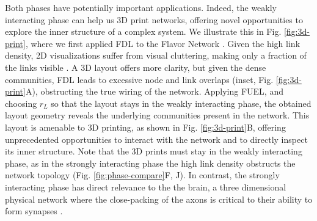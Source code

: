 \documentclass[linenumbers,endfloats,nofootinbib,preprint,floatfix,titlepage,superscriptaddress]{revtex4-1} %
\begin{document}
Both phases have potentially important applications. 
Indeed, the weakly interacting phase can help us 3D print networks, offering novel opportunities to explore the inner structure of a complex system. 
We illustrate this in Fig. \ref{fig:3d-print}, where we first applied FDL to the Flavor Network \cite{ahn2011flavor}.
Given the high link density, 2D visualizations suffer from visual cluttering, making only a fraction of the links visible \cite{ahn2011flavor}. 
A 3D layout offers more clarity, but %
given the dense communities, FDL leads to excessive node and link overlaps (inset, Fig. \ref{fig:3d-print}A), obstructing the true wiring of the network. 
Applying FUEL, and choosing $r_L$ so that the layout stays in the weakly interacting phase, the obtained layout geometry reveals the underlying  communities present in the network. 
This layout is amenable to 3D printing, as shown in Fig. \ref{fig:3d-print}B, offering unprecedented opportunities to interact with the network and to directly inspect its inner structure.
Note that the 3D prints must stay in the weakly interacting phase, as in the strongly interacting phase the high link density obstructs the network topology (Fig. \ref{fig:phase-compare}F, J).
In contrast, the strongly interacting phase has direct relevance to the the brain, a three dimensional physical network where the close-packing of the axons is critical to their ability to form synapses \cite{stepanyants2002geometry,rivera2011wiring}. 
\end{document}
